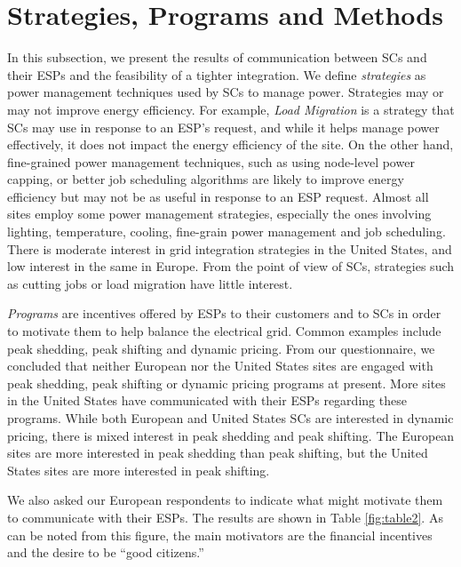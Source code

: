 \section{Strategies, Programs and Methods}
\label{spm}
In this subsection, we present the results of communication between SCs and their ESPs and the feasibility of a tighter integration. We define \emph{strategies} as power management techniques used by SCs to manage power. Strategies may or may not improve energy efficiency. For example, \emph{Load Migration} is a strategy that SCs may use in response to an ESP's request, and while it helps manage power effectively, it does not impact the energy efficiency of the site. On the other hand, fine-grained power management techniques, such as using node-level power capping, or better job scheduling algorithms are likely to improve energy efficiency but may not be as useful in response to an ESP request. Almost all sites employ some power management strategies, especially the ones involving lighting, temperature, cooling, fine-grain power management and job scheduling. There is moderate interest in grid integration strategies in the United States, and low interest in the same in Europe. From the point of view of SCs, strategies such as cutting jobs or load migration have little interest. 

\emph{Programs} are incentives offered by ESPs to their customers and to SCs in order to motivate them to help balance the electrical grid. Common examples include peak shedding, peak shifting and dynamic pricing. From our questionnaire, we concluded that neither European nor the United States sites are engaged with peak shedding, peak shifting or dynamic pricing programs at present. More sites in the United States have communicated with their ESPs regarding these programs. While both European and United States SCs are interested in dynamic pricing, there is mixed interest in peak shedding and peak shifting. The European sites are more interested in peak shedding than peak shifting, but the United States sites are more interested in peak shifting. 

We also asked our European respondents to indicate what might motivate them to communicate with their ESPs. The results are shown in Table \ref{fig:table2}. As can be noted from this figure, the main motivators are the financial incentives and the desire to be ``good citizens.''

